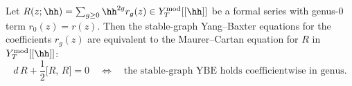 \begin{theorem}
Let
$R(z;\hh)=\sum_{g \ge 0}\hh^{2g}r_g(z)\in Y_T^{\mathrm{mod}}[[\hh]]$
be a formal series with genus-$0$ term $r_0(z)=r(z)$. Then the
stable-graph Yang--Baxter equations for the coefficients $r_g(z)$ are
equivalent to the Maurer--Cartan equation for $R$ in
$Y_T^{\mathrm{mod}}[[\hh]]$:
\begin{equation}
d\, R
+ \frac{1}{2}\bigl[R,\, R\bigr]
= 0
\quad \Longleftrightarrow \quad
\text{the stable-graph YBE holds coefficientwise in genus.}
\end{equation}
\end{theorem}


